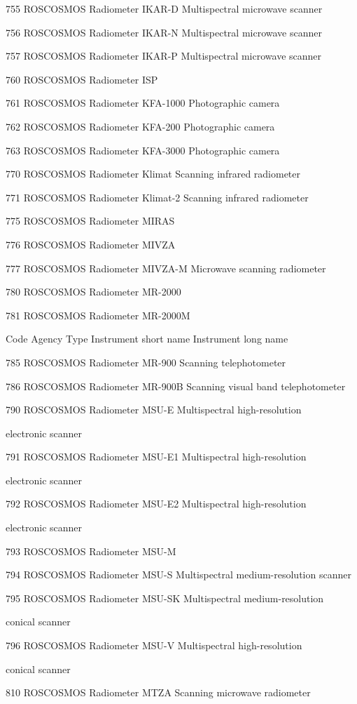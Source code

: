 755 ROSCOSMOS Radiometer IKAR-D Multispectral microwave scanner

756 ROSCOSMOS Radiometer IKAR-N Multispectral microwave scanner

757 ROSCOSMOS Radiometer IKAR-P Multispectral microwave scanner

760 ROSCOSMOS Radiometer ISP

761 ROSCOSMOS Radiometer KFA-1000 Photographic camera

762 ROSCOSMOS Radiometer KFA-200 Photographic camera

763 ROSCOSMOS Radiometer KFA-3000 Photographic camera

770 ROSCOSMOS Radiometer Klimat Scanning infrared radiometer

771 ROSCOSMOS Radiometer Klimat-2 Scanning infrared radiometer

775 ROSCOSMOS Radiometer MIRAS

776 ROSCOSMOS Radiometer MIVZA

777 ROSCOSMOS Radiometer MIVZA-M Microwave scanning radiometer

780 ROSCOSMOS Radiometer MR-2000

781 ROSCOSMOS Radiometer MR-2000M

Code Agency Type Instrument short name Instrument long name

785 ROSCOSMOS Radiometer MR-900 Scanning telephotometer

786 ROSCOSMOS Radiometer MR-900B Scanning visual band telephotometer

790 ROSCOSMOS Radiometer MSU-E Multispectral high-resolution

electronic scanner

791 ROSCOSMOS Radiometer MSU-E1 Multispectral high-resolution

electronic scanner

792 ROSCOSMOS Radiometer MSU-E2 Multispectral high-resolution

electronic scanner

793 ROSCOSMOS Radiometer MSU-M

794 ROSCOSMOS Radiometer MSU-S Multispectral medium-resolution scanner

795 ROSCOSMOS Radiometer MSU-SK Multispectral medium-resolution

conical scanner

796 ROSCOSMOS Radiometer MSU-V Multispectral high-resolution

conical scanner

810 ROSCOSMOS Radiometer MTZA Scanning microwave radiometer

